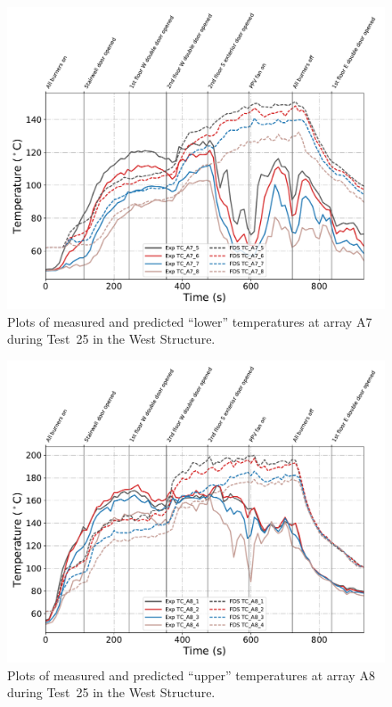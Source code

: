 \begin{figure}[!h]
	\centering
	\includegraphics[width=\columnwidth]{Figures/Plots/Validation/Temperature/Test_25_TC_A7_lower}
	\caption{Plots of measured and predicted ``lower'' temperatures at array A7 during Test~25 in the West Structure.}
	\label{fig:TCA7_lower_data_Test25}
\end{figure}

\begin{figure}[!h]
	\centering
	\includegraphics[width=\columnwidth]{Figures/Plots/Validation/Temperature/Test_25_TC_A8_upper}
	\caption{Plots of measured and predicted ``upper'' temperatures at array A8 during Test~25 in the West Structure.}
	\label{fig:TCA8_upper_data_Test25}
\end{figure}

